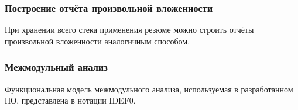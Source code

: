 \documentclass[hyperref={pdfpagelabels=false},10pt,gray]{beamer}
\begin{document}
\begin{frame}
\frametitle{Построение отчёта произвольной вложенности}
При хранении всего стека применения резюме можно строить отчёты произвольной вложенности аналогичным способом.
\begin{figure}[h]
\end{figure}
\end{frame}



\begin{frame}
\frametitle{Межмодульный анализ}
Функциональная модель межмодульного анализа, используемая в разработанном ПО, представлена в нотации IDEF0.
\begin{figure}[h]
\end{figure}
\end{frame}
\end{document}
